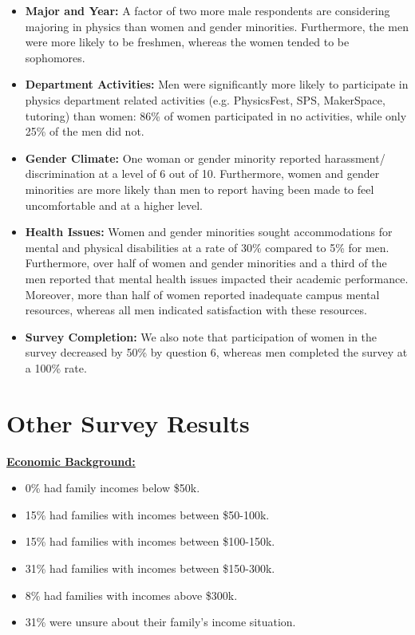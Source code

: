 \documentclass[oneside]{book}   %
\begin{document}
\begin{itemize}
	\item \textbf{Major and Year:} A factor of two more male respondents are considering majoring in physics than women and gender minorities. Furthermore, the men were more likely to be freshmen, whereas the women tended to be sophomores.
	\item \textbf{Department Activities:}  Men were significantly more likely to participate in physics department related activities (e.g. PhysicsFest, SPS, MakerSpace, tutoring) than women: 86\% of women participated in no activities, while only 25\% of the men did not.
	\item \textbf{Gender Climate:} One woman or gender minority reported harassment/\\discrimination at a level of 6 out of 10. Furthermore, women and gender minorities are more likely than men to report having been made to feel uncomfortable and at a higher level.
	\item \textbf{Health Issues:} Women and gender minorities sought accommodations for mental and physical disabilities at a rate of 30\% compared to 5\% for men. Furthermore, over half of women and gender minorities and a third of the men reported that mental health issues impacted their academic performance. Moreover, more than half of women reported inadequate campus mental resources, whereas all men indicated satisfaction with these resources.
	\item \textbf{Survey Completion:} We also note that participation of women in the survey decreased by 50\% by question 6, whereas men completed the survey at a 100\% rate.
\end{itemize}

\section{Other Survey Results}
\noindent\underline{\textbf{Economic Background:}}
\begin{itemize}
	\item 0\% had family incomes below \$50k.
	\item 15\% had families with incomes between \$50-100k.
	\item 15\% had families with incomes between \$100-150k.
	\item 31\% had families with incomes between \$150-300k.
	\item 8\% had families with incomes above \$300k.
	\item 31\% were unsure about their family's income situation.
\end{itemize}
\end{document}
